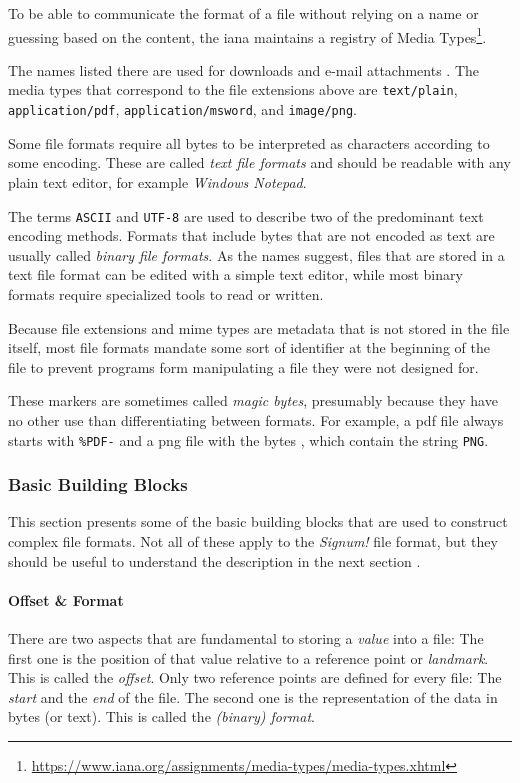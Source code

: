 To be able to communicate the format of a file without relying on a name or guessing based on the content, the \acrshort{iana} maintains a registry of \glspl{Media Type}\footnote{\url{https://www.iana.org/assignments/media-types/media-types.xhtml}}.

The names listed there are used for downloads and e-mail attachments \cite{rfc6838}. The media types that correspond to the file extensions above are \texttt{text/plain}, \texttt{application/pdf}, \texttt{application/msword}, and \texttt{image/png}.

Some file formats require all \glspl{byte} to be interpreted as characters according to some \gls{encoding}. These are called \textit{text file formats} \cite[§4.2.1]{rfc6838} and should be readable with any plain text editor, for example \textit{Windows Notepad}.

The terms \texttt{ASCII} and \texttt{UTF-8} are used to describe two of the predominant text encoding methods. Formats that include \glspl{byte} that are not encoded as text are usually called \textit{binary file formats}. As the names suggest, files that are stored in a text file format can be edited with a simple text editor, while most binary formats require specialized tools to read or written.

Because file extensions and \acrshort{mime} types are metadata that is not stored in the file itself, most file formats mandate some sort of identifier at the beginning of the file to prevent programs form manipulating a file they were not designed for.

These markers are sometimes called \textit{magic bytes}, presumably because they have no other use than differentiating between formats. For example, a \acrshort{pdf} file always starts with \texttt{\%PDF-} and a \acrshort{png} file with the bytes , which contain the string \texttt{PNG}.

\subsubsection{Basic Building Blocks}

This section presents some of the basic building blocks that are used to construct complex file formats. Not all of these apply to the \textit{Signum!} file format, but they should be useful to understand the description in the next section \cite[§1.5]{murray1996eggf}.

\paragraph{Offset \& Format}
There are two aspects that are fundamental to storing a \textit{value} into a file: The first one is the position of that value relative to a reference point or \textit{landmark}. This is called the \textit{offset}. Only two reference points are defined for every file: The \textit{start} and the \textit{end} of the file. %
The second one is the representation of the data in bytes (or text). This is called the \textit{(binary) format}.

